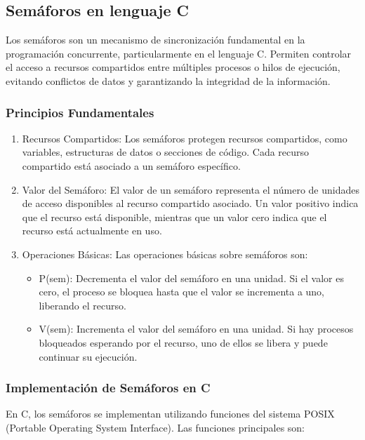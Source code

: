 \subsection{Semáforos en lenguaje C}

Los semáforos son un mecanismo de sincronización fundamental en la programación concurrente, particularmente en el lenguaje C. Permiten controlar el acceso a recursos compartidos entre múltiples procesos o hilos de ejecución, evitando conflictos de datos y garantizando la integridad de la información.

\subsubsection{Principios Fundamentales}

\begin{enumerate} \def\labelenumi{\arabic{enumi}.} \item   Recursos Compartidos: Los semáforos protegen recursos compartidos,   como variables, estructuras de datos o secciones de código. Cada   recurso compartido está asociado a un semáforo específico. \item   Valor del Semáforo: El valor de un semáforo representa el número de   unidades de acceso disponibles al recurso compartido asociado. Un   valor positivo indica que el recurso está disponible, mientras que un   valor cero indica que el recurso está actualmente en uso. \item   Operaciones Básicas: Las operaciones básicas sobre semáforos son:

          \begin{itemize}   \item     P(sem): Decrementa el valor del semáforo en una unidad. Si el valor     es cero, el proceso se bloquea hasta que el valor se incrementa a     uno, liberando el recurso.   \item     V(sem): Incrementa el valor del semáforo en una unidad. Si hay     procesos bloqueados esperando por el recurso, uno de ellos se libera     y puede continuar su ejecución.   \end{itemize} \end{enumerate}

\subsubsection{Implementación de Semáforos en C}

En C, los semáforos se implementan utilizando funciones del sistema POSIX (Portable Operating System Interface). Las funciones principales son:

